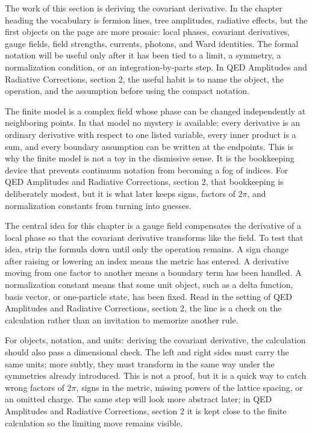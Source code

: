 The work of this section is deriving the covariant derivative.  In the chapter heading the vocabulary is fermion lines, tree amplitudes, radiative effects, but the first objects on the page are more prosaic: local phases, covariant derivatives, gauge fields, field strengths, currents, photons, and Ward identities.  The formal notation will be useful only after it has been tied to a limit, a symmetry, a normalization condition, or an integration-by-parts step.  In QED Amplitudes and Radiative Corrections, section 2, the useful habit is to name the object, the operation, and the assumption before using the compact notation.

The finite model is a complex field whose phase can be changed independently at neighboring points.  In that model no mystery is available: every derivative is an ordinary derivative with respect to one listed variable, every inner product is a sum, and every boundary assumption can be written at the endpoints.  This is why the finite model is not a toy in the dismissive sense.  It is the bookkeeping device that prevents continuum notation from becoming a fog of indices.  For QED Amplitudes and Radiative Corrections, section 2, that bookkeeping is deliberately modest, but it is what later keeps signs, factors of \(2\pi\), and normalization constants from turning into guesses.

The central idea for this chapter is a gauge field compensates the derivative of a local phase so that the covariant derivative transforms like the field.  To test that idea, strip the formula down until only the operation remains.  A sign change after raising or lowering an index means the metric has entered.  A derivative moving from one factor to another means a boundary term has been handled.  A normalization constant means that some unit object, such as a delta function, basis vector, or one-particle state, has been fixed.  Read in the setting of QED Amplitudes and Radiative Corrections, section 2, the line is a check on the calculation rather than an invitation to memorize another rule.

For objects, notation, and units: deriving the covariant derivative, the calculation should also pass a dimensional check.  The left and right sides must carry the same units; more subtly, they must transform in the same way under the symmetries already introduced.  This is not a proof, but it is a quick way to catch wrong factors of \(2\pi\), signs in the metric, missing powers of the lattice spacing, or an omitted charge.  The same step will look more abstract later; in QED Amplitudes and Radiative Corrections, section 2 it is kept close to the finite calculation so the limiting move remains visible.

